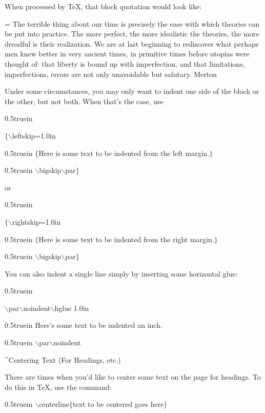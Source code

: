 When processed by \TeX{}, that block quotation would look like:
\bigskip\par\noindent
{\parindent=0.5in
\baselineskip=\normalbaselineskip
\narrower
{The terrible thing about our time is precisely 
the ease with which theories can be put into 
practice. The more perfect, the more idealistic the 
theories, the more dreadful is their realization.  
We are at last beginning to rediscover what perhaps 
men knew better in very ancient times, in primitive  
times before utopias were thought of: that liberty 
is bound up with imperfection, and that limitations, 
imperfections, errors are not only unavoidable
but salutary. Merton}
\bigskip\par}
Under some circumstances, you may only want to indent one side of the
block or the other, but not both. When that's the case, use
\bigskip\par\noindent\hglue 0.5truein
{\twltt $\{${}$\backslash$leftskip=1.0in 
\par\noindent\hglue 0.5truein
$\{$Here is some text to be indented from the left margin.$\}$
\par\noindent\hglue 0.5truein
$\backslash$bigskip$\backslash$par$\}$} 
\bigskip\par\noindent
or 
\bigskip\par\noindent\hglue 0.5truein
{\twltt $\{${}$\backslash$rightskip=1.0in 
\par\noindent\hglue 0.5truein
$\{$Here is some text to be indented from the right margin.$\}$
\par\noindent\hglue 0.5truein
$\backslash$bigskip$\backslash$par$\}$} 
\bigskip\par\noindent
You can also indent a single line simply by inserting some horizontal glue:
\bigskip\par\noindent\hglue 0.5truein
{\twltt $\backslash$par$\backslash$noindent$\backslash$hglue 1.0in
\par\noindent\hglue 0.5truein
Here's some text to be indented an inch.
\par\noindent\hglue 0.5truein
$\backslash$par$\backslash$noindent}
\bigskip\bigskip\bigskip\par\noindent
\centerline{\twlbf ^{Centering Text} (For Headings, etc.)}
\bigskip\par\noindent
There are times when you'd like to center some text on the page
for headings. To do this in \TeX{}, use the command:
\bigskip\par\noindent\hglue 0.5truein
{\twltt $\backslash$centerline$\{$text to be centered goes here$\}$}
